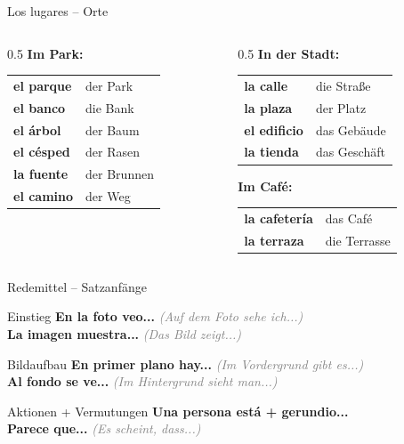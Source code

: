 \documentclass[aspectratio=169, 14pt]{beamer}
\newcommand{\es}[1]{\textbf{#1}}
\newcommand{\de}[1]{\textit{\textcolor{gray}{#1}}}
\begin{document}
\begin{frame}{Los lugares – Orte}

\begin{columns}
\begin{column}{0.5\textwidth}
\textbf{Im Park:}
\begin{tabular}{ll}
\es{el parque} & der Park \\
\es{el banco} & die Bank \\
\es{el árbol} & der Baum \\
\es{el césped} & der Rasen \\
\es{la fuente} & der Brunnen \\
\es{el camino} & der Weg \\
\end{tabular}
\end{column}

\begin{column}{0.5\textwidth}
\textbf{In der Stadt:}
\begin{tabular}{ll}
\es{la calle} & die Straße \\
\es{la plaza} & der Platz \\
\es{el edificio} & das Gebäude \\
\es{la tienda} & das Geschäft \\
\end{tabular}

\vspace{0.5em}

\textbf{Im Café:}
\begin{tabular}{ll}
\es{la cafetería} & das Café \\
\es{la terraza} & die Terrasse \\
\end{tabular}
\end{column}
\end{columns}

\end{frame}

\begin{frame}{Redemittel – Satzanfänge}

\begin{block}{Einstieg}
\es{En la foto veo...} \de{(Auf dem Foto sehe ich...)}\\
\es{La imagen muestra...} \de{(Das Bild zeigt...)}
\end{block}

\begin{block}{Bildaufbau}
\es{En primer plano hay...} \de{(Im Vordergrund gibt es...)}\\
\es{Al fondo se ve...} \de{(Im Hintergrund sieht man...)}
\end{block}

\begin{block}{Aktionen + Vermutungen}
\es{Una persona está + gerundio...}\\
\es{Parece que...} \de{(Es scheint, dass...)}
\end{block}

\end{frame}
\end{document}
